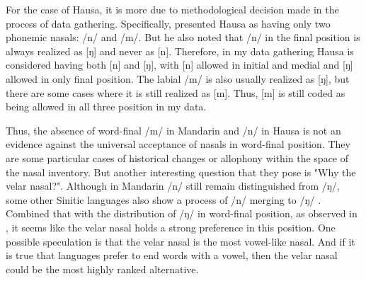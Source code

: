 \par
For the case of Hausa, it is more due to methodological decision made in the process of data gathering. Specifically, \citet{newmanHausaLanguageEncyclopedic2000} presented Hausa as having only two phonemic nasals: /n/ and /m/. 
But he also noted that /n/ in the final position is always realized as [ŋ] and never as [n]. 
Therefore, in my data gathering Hausa is considered having both [n] and [ŋ], with [n] allowed in initial and medial and [ŋ] allowed in only final position.
The labial /m/ is also usually realized as [ŋ], but there are some cases where it is still realized as [m].
Thus, [m] is still coded as being allowed in all three position in my data.

\par
Thus, the absence of word-final /m/ in Mandarin and /n/ in Hausa is not an evidence against the universal acceptance of nasals in word-final position.
They are some particular cases of historical changes or allophony within the space of the nasal inventory.
But another interesting question that they pose is "Why the velar nasal?".
Although in Mandarin /n/ still remain distinguished from /ŋ/, some other Sinitic languages also show a process of /n/ merging to /ŋ/ \citet{zee1985sound}.
Combined that with the distribution of /ŋ/ in word-final position, as observed in \citet{wals-9}, it seems like the velar nasal holds a strong preference in this position.
One possible speculation is that the velar nasal is the most vowel-like nasal.
And if it is true that languages prefer to end words with a vowel, then the velar nasal could be the most highly ranked alternative.
